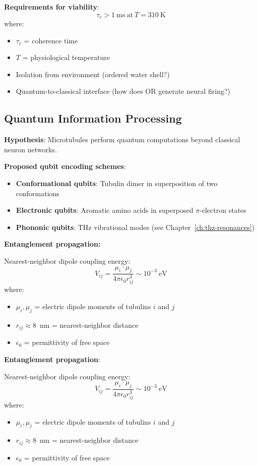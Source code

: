 \textbf{Requirements for viability}:
\begin{equation}
\tau_c > 1~\mathrm{ms}~\text{at}~T = 310~\mathrm{K}
\end{equation}
where:
\begin{itemize}
\item $\tau_c$ = coherence time
\item $T$ = physiological temperature
\item Isolation from environment (ordered water shell?)
\item Quantum-to-classical interface (how does OR generate neural firing?)
\end{itemize}

\subsection{Quantum Information Processing}
\label{subsec:quantum-computation}

\textbf{Hypothesis}: Microtubules perform quantum computations beyond classical neuron networks.

\textbf{Proposed qubit encoding schemes}:
\begin{itemize}
\item \textbf{Conformational qubits}: Tubulin dimer in superposition of two conformations
\item \textbf{Electronic qubits}: Aromatic amino acids in superposed $\pi$-electron states
\item \textbf{Phononic qubits}: THz vibrational modes (see Chapter~\ref{ch:thz-resonances})
\end{itemize}

\textbf{Entanglement propagation:}

Nearest-neighbor dipole coupling energy:
\begin{equation}
V_{ij} = \frac{\mu_i \cdot \mu_j}{4\pi\epsilon_0 r_{ij}^3} \sim 10^{-3}~\mathrm{eV}
\label{eq:dipole-coupling}
\end{equation}
where:
\begin{itemize}
\item $\mu_i, \mu_j$ = electric dipole moments of tubulins $i$ and $j$
\item $r_{ij} \approx 8$~nm = nearest-neighbor distance
\item $\epsilon_0$ = permittivity of free space
\end{itemize}

\textbf{Entanglement propagation}:

Nearest-neighbor dipole coupling energy:
\begin{equation}
V_{ij} = \frac{\mu_i \cdot \mu_j}{4\pi\epsilon_0 r_{ij}^3} \sim 10^{-3}~\mathrm{eV}
\label{eq:dipole-coupling}
\end{equation}
where:
\begin{itemize}
\item $\mu_i, \mu_j$ = electric dipole moments of tubulins $i$ and $j$
\item $r_{ij} \approx 8$~nm = nearest-neighbor distance
\item $\epsilon_0$ = permittivity of free space
\end{itemize}

